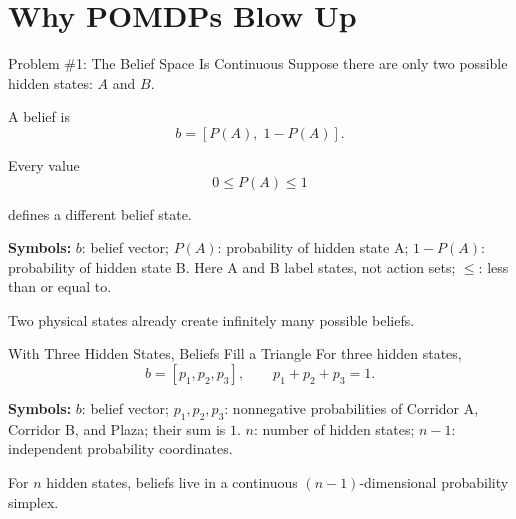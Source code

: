 \documentclass[aspectratio=169,10pt]{beamer}
\newcommand{\equationlegend}[1]{%
  \par\smallskip
  \begingroup
    \setlength{\fboxsep}{4pt}%
    \noindent\colorbox{DeckSoft}{%
      \parbox{\dimexpr\linewidth-2\fboxsep\relax}{%
        \footnotesize\textbf{Symbols:} #1%
      }%
    }\par
  \endgroup
  \smallskip
}
\begin{document}
\section{Why POMDPs Blow Up}

\begin{frame}[shrink=10]{Problem \#1: The Belief Space Is Continuous}
  Suppose there are only two possible hidden states: $A$ and $B$.

  A belief is
  \[
    b=[P(A),\;1-P(A)].
  \]

  Every value
  \[
    0\le P(A)\le1
  \]

  defines a different belief state.
  \equationlegend{$b$: belief vector; $P(A)$: probability of hidden state A; $1-P(A)$: probability of hidden state B. Here A and B label states, not action sets; $\le$: less than or equal to.}

  \begin{keyidea}
    Two physical states already create infinitely many possible beliefs.
  \end{keyidea}
\end{frame}

\begin{frame}{With Three Hidden States, Beliefs Fill a Triangle}
  \small
  For three hidden states,
  \[
    b=[p_1,p_2,p_3],
    \qquad
    p_1+p_2+p_3=1.
  \]
  \equationlegend{$b$: belief vector; $p_1,p_2,p_3$: nonnegative probabilities of Corridor A, Corridor B, and Plaza; their sum is $1$. $n$: number of hidden states; $n-1$: independent probability coordinates.}

  \begin{center}
  \end{center}

  \begin{keyidea}
    For $n$ hidden states, beliefs live in a continuous $(n-1)$-dimensional probability simplex.
  \end{keyidea}
\end{frame}
\end{document}
